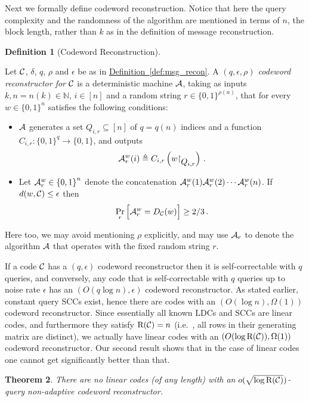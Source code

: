 \documentclass[10pt]{article}
\newtheorem{theorem}{Theorem}[section]
\theoremstyle{definition}
\newtheorem{definition}[theorem]{Definition}
\providecommand{\ie}{i.e.\ }
\numberwithin{equation}{section}
\newcommand{\expref}[2]{\texorpdfstring{\hyperref[#2]{#1~\ref{#2}}}{#1~\ref{#2}}}
\newcommand{\naturals}{{\mathbb N}}
\newcommand{\ALG}{{\cal A}}
\newcommand{\CC}{{\cal C}}
\newcommand{\zo}{{\{0,1\}}}
\newcommand{\DEC}{{D_{\cal C}}}
\newcommand{\drows}{{{\mathrm{R}} }}
\newcommand{\rst}[1]{\ensuremath{{\mathbin\upharpoonright}%
\raise-.9ex\hbox{$#1$}}}
\begin{document}
Next we formally define codeword reconstruction. Notice that here the
query complexity and the randomness of the algorithm are mentioned in
terms of $n$, the block length, rather than $k$ as in the definition of message reconstruction.

\begin{definition}[Codeword Reconstruction] \label{def:cod_recon}

Let $\CC$, $\delta$, $q$, $\rho$ and $\epsilon$ be as in \expref{Definition}{def:msg_recon}.
A \emph{$(q,\epsilon, \rho)$ codeword reconstructor for $\CC$} is a deterministic machine $\ALG$, taking as inputs $k,n=n(k) \in \naturals$, $i\in [n]$ and a random string $r \in \zo^{\rho(n)}$, that for every $w \in \zo^n$ satisfies the following conditions:
\begin{itemize}
\item $\ALG$ generates a set $Q_{i,r} \subseteq [n]$ of $q=q(n)$ indices and a function $C_{i,r}:\zo^q \to \zo$, and outputs
\[
\ALG^w_r(i) \triangleq C_{i,r}\left(w\rst{Q_{i,r}}\right)\,.
\]
\item Let $\ALG^w_r \in \zo^n$ denote the concatenation $\ALG^w_r(1)
  \ALG^w_r(2)  \cdots  \ALG^w_r(n)$. If $d(w,\CC) \leq \epsilon$ then
\[
\Pr_r\Big[\ALG^w_r = \DEC(w)\Big] \geq 2/3\,.
\]
\end{itemize}
Here too, we may avoid mentioning $\rho$ explicitly, and may use $\ALG_r$ to denote the algorithm $\ALG$ that operates with the fixed random string $r$.
\end{definition}

If a code $\CC$ has a $(q,\epsilon)$ codeword reconstructor then it is self-correctable with $q$ queries, and conversely, any code that is self-correctable with $q$ queries up to noise rate $\epsilon$ has an $(O(q \log n),\epsilon)$ codeword reconstructor.
As stated earlier, constant query SCCs exist, hence there are codes with an $(O(\log n),\Omega(1))$ codeword reconstructor. Since essentially all known LDCs and SCCs are linear codes, and furthermore they satisfy $\drows(\CC) = n$ (\ie, all rows in their generating matrix are distinct), we actually have linear codes with an $(O(\log \drows(\CC)),\Omega(1))$ codeword reconstructor.  Our second result shows that in the case of linear codes one cannot get significantly better than that.

\begin{theorem}\label{theo:cdw}
There are no linear codes (of \emph{any} length) with an $o(\sqrt{\log \drows(\CC)})$-query non-adaptive codeword reconstructor.
\end{theorem}
\end{document}

